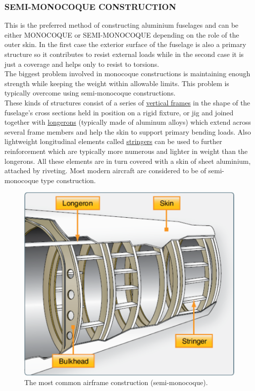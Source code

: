 \subsubsection*{SEMI-MONOCOQUE CONSTRUCTION}
\noindent This is the preferred method of constructing aluminium fuselages and can be either MONOCOQUE or SEMI-MONOCOQUE depending on the role of the outer skin. In the first case the exterior surface of the fuselage is also a primary structure so it contributes to resist external loads while in the second case it is just a coverage and helps only to resist to torsions. \\
The biggest problem involved in monocoque constructions is maintaining enough strength while keeping the weight within allowable limits. This problem is typically overcome using semi-monocoque constructions. \\
These kinds of structures consist of a series of \underline{vertical frames} in the shape of the fuselage's cross sections held in position on a rigid fixture, or jig and joined together with \underline{longerons} (typically made of aluminum alloys) which extend across several frame members and help the skin to support primary bending loads. Also lightweight longitudinal elements called \underline{stringers} can be used to further reinforcement which are typically more numerous and lighter in weight than the longerons. All these elements are in turn covered with a skin of sheet aluminium, attached by riveting. 
Most modern aircraft are considered to be of semi-monocoque type construction. \\

\smallskip
\begin{figure}[h!]
	\begin{center}
		\centering  		 		
		\includegraphics[width=0.7\linewidth]{PICTURES/1_Theory/PNG/semi-monocoque.png}
	\end{center}
	\caption {The most common airframe construction (semi-monocoque).}
\end{figure}

